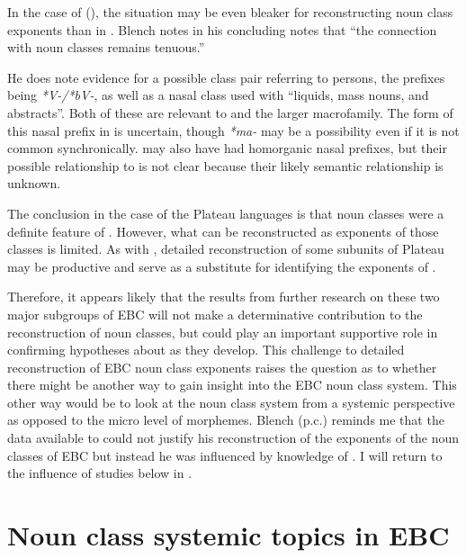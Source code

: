 \documentclass[output=paper]{langsci/langscibook}
\begin{document}
In the case of  (), the situation may be even bleaker for reconstructing  noun class exponents than in . Blench notes in his concluding notes that “the connection with  noun classes remains tenuous.” 

 
He does note evidence for a possible class pair referring to persons, the prefixes being \textit{*V-/*bV-}, as well as a nasal class used with “liquids, mass nouns, and abstracts”. Both of these are relevant to  and the larger  macrofamily. The form of this nasal prefix in  is uncertain, though \textit{*ma-} may be a possibility even if it is not common synchronically.  may also have had homorganic nasal prefixes, but their possible relationship to  is not clear because their likely semantic relationship is unknown.

The conclusion in the case of the Plateau languages is that noun classes were a definite feature of . However, what can be reconstructed as exponents of those classes is limited. As with , detailed reconstruction of some subunits of Plateau may be productive and serve as a substitute for identifying the exponents of . 

Therefore, it appears likely that the results from further research on these two major subgroups of EBC will not make a determinative contribution to the reconstruction of  noun classes, but could play an important supportive role in confirming hypotheses about  as they develop. This challenge to detailed reconstruction of EBC noun class exponents raises the question as to whether there might be another way to gain insight into the EBC noun class system. This other way would be to look at the noun class system from a systemic perspective as opposed to the micro level of morphemes. Blench (p.c.) reminds me that the data available to \citet{deWolf1971} could not justify his reconstruction of the exponents of the noun classes of EBC but instead he was influenced by knowledge of . I will return to the influence of  studies below in .


\section{Noun class systemic topics in EBC}\label{sec:watters:6}
 
\end{document}
